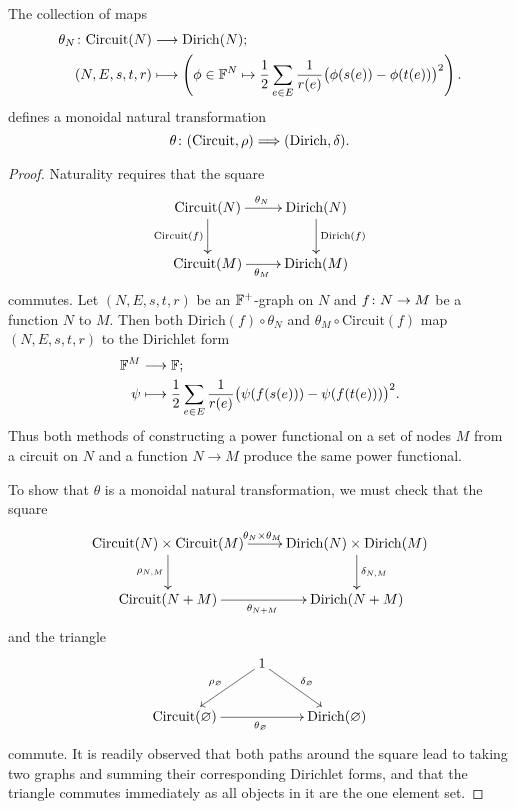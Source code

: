 \begin{proposition} 
  The collection of maps
\begin{align*}
  \theta_N{\colon} \mathrm{Circuit}(N) &\longrightarrow \mathrm{Dirich}(N); \\
  (N,E,s,t,r) &\longmapsto \left(\phi \in {\mathbb F}^N \mapsto \frac{1}{2} \sum_{e \in E}
  \frac{1}{r(e)}\big(\phi(s(e))-\phi(t(e))\big)^2\right).
\end{align*}
defines a monoidal natural transformation
\[
  \theta{\colon} (\mathrm{Circuit},\rho) \Longrightarrow
  (\mathrm{Dirich},\delta).
\]
\end{proposition}
\begin{proof}
Naturality requires that the square
\[
  \xymatrix{
    \mathrm{Circuit}(N) \ar[r]^{\theta_N} \ar[d]_{\mathrm{Circuit}(f)} &
    \mathrm{Dirich}(N) \ar[d]^{\mathrm{Dirich}(f)}  \\
    \mathrm{Circuit}(M) \ar[r]_{\theta_M} & \mathrm{Dirich}(M)
  }
\]
commutes. Let $(N,E,s,t,r)$ be an ${\mathbb F}^+$-graph on $N$ and $f{\colon} N \to M$ be a
function $N$ to $M$. Then both $\mathrm{Dirich}(f) \circ \theta_N$ and $\theta_M
\circ \mathrm{Circuit}(f)$ map $(N,E,s,t,r)$ to the Dirichlet form
\begin{align*}
  {\mathbb F}^M &\longrightarrow {\mathbb F};\\
  \psi &\longmapsto \frac{1}{2} \sum_{e \in E}\frac{1}{r(e)}
  \big(\psi(f(s(e)))-\psi(f(t(e)))\big)^2.
\end{align*}
Thus both methods of constructing a power functional on a set of nodes $M$ from
a circuit on $N$ and a function $N \to M$ produce the same power functional.

To show that $\theta$ is a monoidal natural transformation, we must check that
the square
\[
\xymatrix{
  \mathrm{Circuit}(N) \times \mathrm{Circuit}(M) \ar[r]^{\theta_N \times
  \theta_M} \ar[d]_{\rho_{N,M}} & \mathrm{Dirich}(N) \times \mathrm{Dirich}(M)
  \ar[d]^{\delta_{N,M}}  \\
  \mathrm{Circuit}(N+M) \ar[r]_{\theta_{N+M}} & \mathrm{Dirich}(N+M)
}
\]
and the triangle
\[
\xymatrix{
  & 1 \ar[dl]_{\rho_\varnothing} \ar[dr]^{\delta_\varnothing}\\
\mathrm{Circuit}(\varnothing)  \ar[rr]_{\theta_\varnothing} &&
\mathrm{Dirich}(\varnothing)
}
\]
commute. It is readily observed that both paths around the square lead to taking
two graphs and summing their corresponding Dirichlet forms, and that the
triangle commutes immediately as all objects in it are the one element set.
\end{proof}

